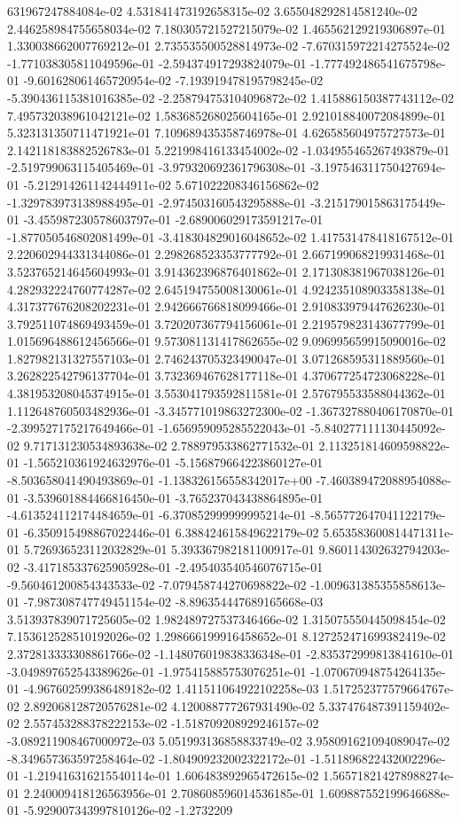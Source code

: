 631967247884084e-02	4.531841473192658315e-02	3.655048292814581240e-02	2.446258984755658034e-02	7.180305721527215079e-02	1.465562129219306897e-01	1.330038662007769212e-01	2.735535500528814973e-02	-7.670315972214275524e-02	-1.771038305811049596e-01	-2.594374917293824079e-01	-1.777492486541675798e-01	-9.601628061465720954e-02	-7.193919478195798245e-02	-5.390436115381016385e-02	-2.258794753104096872e-02	1.415886150387743112e-02	7.495732038961042121e-02	1.583685268025604165e-01	2.921018840072084899e-01	5.323131350711471921e-01	7.109689435358746978e-01	4.626585604975727573e-01	2.142118183882526783e-01	5.221998416133454002e-02	-1.034955465267493879e-01	-2.519799063115405469e-01	-3.979320692361796308e-01	-3.197546311750427694e-01	-5.212914261142444911e-02	5.671022208346156862e-02	-1.329783973138988495e-01	-2.974503160543295888e-01	-3.215179015863175449e-01	-3.455987230578603797e-01	-2.689006029173591217e-01	-1.877050546802081499e-01	-3.418304829016048652e-02	1.417531478418167512e-01	2.220602944331344086e-01	2.298268523353777792e-01	2.667199068219931468e-01	3.523765214645604993e-01	3.914362396876401862e-01	2.171308381967038126e-01	4.282932224760774287e-02	2.645194755008130061e-01	4.924235108903358138e-01	4.317377676208202231e-01	2.942666766818099466e-01	2.910833979447626230e-01	3.792511074869493459e-01	3.720207367794156061e-01	2.219579823143677799e-01	1.015696488612456566e-01	9.573081131417862655e-02	9.096995659915090016e-02	1.827982131327557103e-01	2.746243705323490047e-01	3.071268595311889560e-01	3.262822542796137704e-01	3.732369467628177118e-01	4.370677254723068228e-01	4.381953208045374915e-01	3.553041793592811581e-01	2.576795533588044362e-01	1.112648760503482936e-01	-3.345771019863272300e-02	-1.367327880406170870e-01	-2.399527175217649466e-01	-1.656959095285522043e-01	-5.840277111130445092e-02	9.717131230534893638e-02	2.788979533862771532e-01	2.113251814609598822e-01	-1.565210361924632976e-01	-5.156879664223860127e-01	-8.503658041490493869e-01	-1.138326156558342017e+00	-7.460389472088954088e-01	-3.539601884466816450e-01	-3.765237043438864895e-01	-4.613524112174484659e-01	-6.370852999999995214e-01	-8.565772647041122179e-01	-6.350915498867022446e-01	6.388424615849622179e-02	5.653583600814471311e-01	5.726936523112032829e-01	5.393367982181100917e-01	9.860114302632794203e-02	-3.417185337625905928e-01	-2.495403540546076715e-01	-9.560461200854343533e-02	-7.079458744270698822e-02	-1.009631385355858613e-01	-7.987308747749451154e-02	-8.896354447689165668e-03	3.513937839071725605e-02	1.982489727537346466e-02	1.315075550445098454e-02	7.153612528510192026e-02	1.298666199916458652e-01	8.127252471699382419e-02	2.372813333308861766e-02	-1.148076019838336348e-01	-2.835372999813841610e-01	-3.049897652543389626e-01	-1.975415885753076251e-01	-1.070670948754264135e-01	-4.967602599386489182e-02	1.411511064922102258e-03	1.517252377579664767e-02	2.892068128720576281e-02	4.120088777267931490e-02	5.337476487391159402e-02	2.557453288378222153e-02	-1.518709208929246157e-02	-3.089211908467000972e-03	5.051993136858833749e-02	3.958091621094089047e-02	-8.349657363597258464e-02	-1.804909232002322172e-01	-1.511896822432002296e-01	-1.219416316215540114e-01	1.606483892965472615e-02	1.565718214278988274e-01	2.240009418126563956e-01	2.708608596014536185e-01	1.609887552199646688e-01	-5.929007343997810126e-02	-1.2732209
